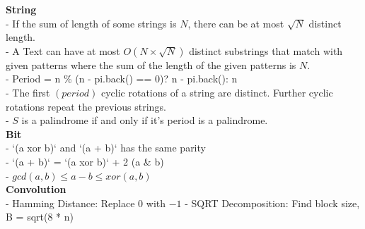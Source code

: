 \textbf{String} \\
- If the sum of length of some strings is \( N \), there can be at most \( \sqrt{N} \) distinct length. \\
- A Text can have at most \( O(N \times \sqrt{N}) \) distinct substrings that match with given patterns where the sum of the length of the given patterns is \( N \). \\
- Period =  n \% (n - pi.back() == 0)? n - pi.back(): n \\
- The first \( (period) \) cyclic rotations of a string are distinct. Further cyclic rotations repeat the previous strings. \\
- \( S \) is a palindrome if and only if it's period is a palindrome. \\

\textbf{Bit} \\
- `(a xor b)` and `(a + b)` has the same parity \\
- `(a + b)` = `(a xor b)` + 2 (a \& b) \\
- $gcd(a, b) \leq a - b \leq xor(a, b)$ \\

\textbf{Convolution} \\
- Hamming Distance: Replace \( 0 \) with \( -1 \)
- SQRT Decomposition: Find block size, B = sqrt(8 * n)
